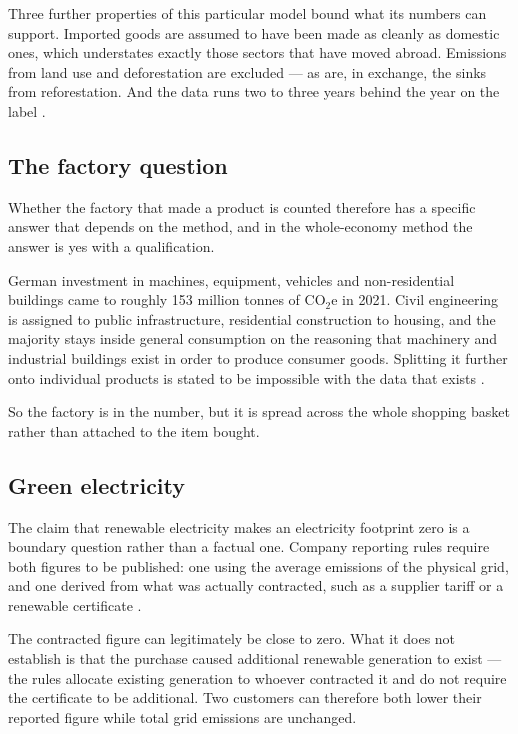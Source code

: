 \documentclass[11pt,a4paper]{article}
\begin{document}
Three further properties of this particular model bound what its numbers can
support. Imported goods are assumed to have been made as cleanly as domestic ones,
which understates exactly those sectors that have moved abroad. Emissions from land
use and deforestation are excluded — as are, in exchange, the sinks from
reforestation. And the data runs two to three years behind the year on the label
\cite{uba-rechner}.

\subsection{The factory question}

Whether the factory that made a product is counted therefore has a specific answer
that depends on the method, and in the whole-economy method the answer is yes with
a qualification.

German investment in machines, equipment, vehicles and non-residential buildings
came to roughly 153 million tonnes of CO$_2$e in 2021. Civil engineering is assigned
to public infrastructure, residential construction to housing, and the majority
stays inside general consumption on the reasoning that machinery and industrial
buildings exist in order to produce consumer goods. Splitting it further onto
individual products is stated to be impossible with the data that exists
\cite{uba-rechner}.

So the factory is in the number, but it is spread across the whole shopping basket
rather than attached to the item bought.

\subsection{Green electricity}

The claim that renewable electricity makes an electricity footprint zero is a
boundary question rather than a factual one. Company reporting rules require both
figures to be published: one using the average emissions of the physical grid, and
one derived from what was actually contracted, such as a supplier tariff or a
renewable certificate \cite{ghgp-scope2}.

The contracted figure can legitimately be close to zero. What it does not establish
is that the purchase caused additional renewable generation to exist — the rules
allocate existing generation to whoever contracted it and do not require the
certificate to be additional. Two customers can therefore both lower their reported
figure while total grid emissions are unchanged.
\end{document}
